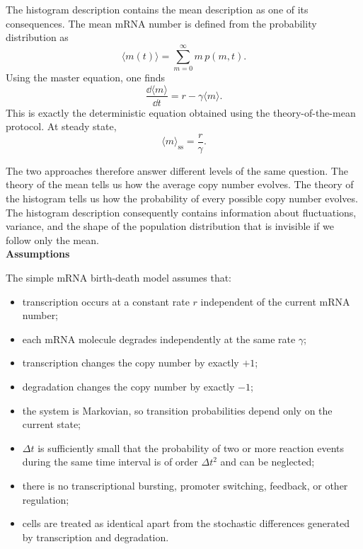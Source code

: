 The histogram description contains the mean description as one of its consequences.
The mean mRNA number is defined from the probability distribution as
\[
    \langle m(t)\rangle = \sum_{m=0}^{\infty}m\,p(m,t).
\]
Using the master equation, one finds
\[
    \boxed{
    \frac{\dd\langle m\rangle}{\dd t}
    = r-\gamma\langle m\rangle
    }.
\]
This is exactly the deterministic equation obtained using the theory-of-the-mean protocol.
At steady state,
\[
    \langle m\rangle_{\mathrm{ss}}=\frac{r}{\gamma}.
\]

The two approaches therefore answer different levels of the same question.
The theory of the mean tells us how the average copy number evolves.
The theory of the histogram tells us how the probability of every possible copy number evolves.
The histogram description consequently contains information about fluctuations, variance, and the shape of the population distribution that is invisible if we follow only the mean.
% 
% 
\medskip
\\
\textbf{Assumptions}

The simple mRNA birth-death model assumes that:

\begin{itemize}
    \item transcription occurs at a constant rate $r$ independent of the current mRNA number;
    \item each mRNA molecule degrades independently at the same rate $\gamma$;
    \item transcription changes the copy number by exactly $+1$;
    \item degradation changes the copy number by exactly $-1$;
    \item the system is Markovian, so transition probabilities depend only on the current state;
    \item $\Delta t$ is sufficiently small that the probability of two or more reaction events during the same time interval is of order $\Delta t^2$ and can be neglected;
    \item there is no transcriptional bursting, promoter switching, feedback, or other regulation;
    \item cells are treated as identical apart from the stochastic differences generated by transcription and degradation.
\end{itemize}


